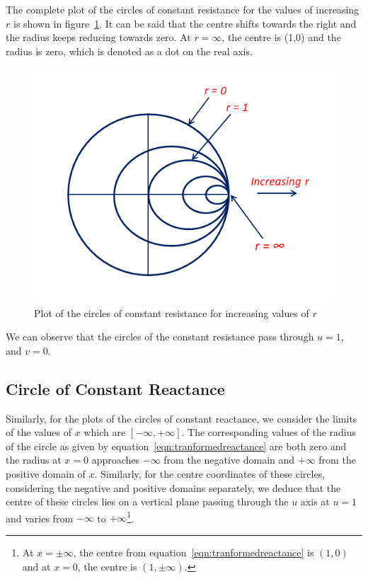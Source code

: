 The complete plot of the circles of constant resistance for the values of increasing $r$ is shown in figure~\ref{fig:rghmgfcx}. It can be said that the centre shifts towards the right and the radius keeps reducing towards zero. At $r = \infty$, the centre is (1,0) and the radius is zero, which is denoted as a dot on the real axis.
\begin{figure}[h]
\centering
\includegraphics[width=0.9\linewidth]{./graphics/const_resistance_circles}
\caption{Plot of the circles of constant resistance for increasing values of $r$}
\label{fig:rghmgfcx}
\end{figure}

We can observe that the circles of the constant resistance pass through $u = 1$, and $v = 0$.

\subsection{Circle of Constant Reactance}
Similarly, for the plots of the circles of constant reactance, we consider the limits of the values of $x$ which are $[-\infty, +\infty]$. The corresponding values of the radius of the circle as given by equation~\eqref{eqn:tranformedreactance} are both zero and the radius at $x = 0$ approaches $-\infty$ from the negative domain and $+\infty$ from the positive domain of $x$. Similarly, for the centre coordinates of these circles, considering the negative and positive domains separately, we deduce that the centre of these circles lies on a vertical plane passing through the $u$ axis at $u = 1$ and varies from $-\infty$ to $+\infty$\footnote{
At $x = \pm\infty$, the centre from equation~\eqref{eqn:tranformedreactance} is $(1, 0)$ and at $x = 0$, the centre is $(1, \pm\infty)$.
}.


